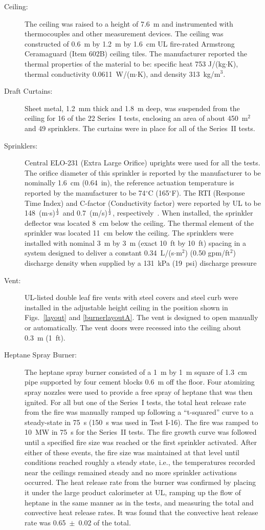 \begin{description}
\item[Ceiling:] The ceiling was raised to a height of 7.6~m and instrumented with thermocouples and other measurement devices. The ceiling was constructed of 0.6~m by 1.2~m by 1.6~cm UL fire-rated Armstrong Ceramaguard (Item 602B) ceiling tiles. The manufacturer reported the thermal properties of the material to be: specific heat 753 J/(kg$\cdot$K), thermal conductivity 0.0611~W/(m$\cdot$K), and density 313~kg/m$^3$.
\item[Draft Curtains:] Sheet metal, 1.2~mm thick and 1.8~m deep, was suspended from the ceiling for 16 of the 22 Series~I tests, enclosing an area of about 450~m$^2$ and 49 sprinklers. The curtains were in place for all of the Series~II tests.
\item[Sprinklers:] Central ELO-231 (Extra Large Orifice) uprights were used for all the tests. The orifice diameter of this sprinkler is reported by the manufacturer to be nominally 1.6~cm (0.64~in), the reference actuation temperature is reported by the manufacturer to be 74$^\circ$C (165$^\circ$F). The RTI (Response Time Index) and C-factor (Conductivity factor) were reported by UL to be 148~(m$\cdot$s)$^{\frac{1}{2}}$ and 0.7~(m/s)$^{\frac{1}{2}}$, respectively~\cite{Sheppard:1}. When installed, the sprinkler deflector was located 8~cm below the ceiling. The thermal element of the sprinkler was located 11~cm below the ceiling. The sprinklers were installed with nominal 3~m by 3~m (exact 10~ft by 10~ft) spacing in a system designed to deliver a constant 0.34~L/(s$\cdot$m$^2$) (0.50 gpm/ft$^2$) discharge density when supplied by a 131~kPa (19~psi) discharge pressure
\item[Vent:] UL-listed double leaf fire vents with steel covers and steel curb were installed in the adjustable height ceiling in the position shown in Figs.~\ref{layout} and \ref{burnerlayoutA}. The vent is designed to open manually or automatically. The vent doors were recessed into the ceiling about 0.3~m (1~ft).
\item[Heptane Spray Burner:] The heptane spray burner consisted of a 1~m by 1~m square of 1.3~cm pipe supported by four cement blocks 0.6~m off the floor. Four atomizing spray nozzles were used to provide a free spray of heptane that was then ignited. For all but one of the Series~I tests, the total heat release rate from the fire was manually ramped up following a ``t-squared'' curve to a steady-state in 75~s (150~s was used in Test I-16). The fire was ramped to 10~MW in 75~s for the Series~II tests. The fire growth curve was followed until a specified fire size was reached or the first sprinkler activated. After either of these events, the fire size was maintained at that level until conditions reached roughly a steady state, i.e., the temperatures recorded near the ceilings remained steady and no more sprinkler activations occurred. The heat release rate from the burner was confirmed by placing it under the large product calorimeter at UL, ramping up the flow of heptane in the same manner as in the tests, and measuring the total and convective heat release rates. It was found that the convective heat release rate was 0.65~$\pm$~0.02 of the total.

\end{description}
